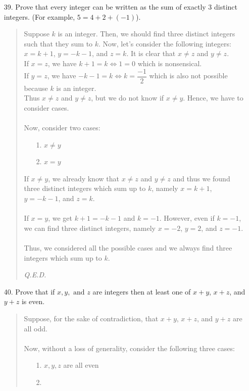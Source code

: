 \documentclass[12pt, a4paper]{article}                      %
\begin{document}
\begin{itemize}
\item[39.]
Prove that every integer can be written as the sum of exactly 3 distinct integers. (For
example, $5 = 4 + 2 + (-1)$).
\begin{quote}
Suppose $k$ is an integer. Then, we should find three distinct integers such that they sum to $k$.
Now, let's consider the following integers:\\
$x = k + 1$, $y = -k - 1$, and $z = k$. It is clear that $x \neq z$ and $y \neq z$.\\
If $x = z$, we have $k + 1 = k \iff 1 = 0$ which is nonsensical.\\
If $y = z$, we have $-k - 1 = k \iff k = \dfrac{-1}{2}$ which is also
not possible because $k$ is an integer.\\
Thus $x \neq z$ and $y \neq z$, but we do not know if $x \neq y$.
Hence, we have to consider cases.
\\\\
Now, consider two cases:
\begin{itemize}
\item[1.]
$x \neq y$
\item[2.]
$x = y$
\end{itemize}
If $x \neq y$, we already know that $x \neq z$ and $y \neq z$ and thus we found three distinct integers which sum up to $k$, namely $x = k + 1$, $y = -k - 1$, and $z = k$.
\\\\
If $x = y$, we get $k + 1 = -k - 1$ and $k = -1$. However, even if $k = -1$, we can find three distinct integers, namely $x = -2$, $y = 2$, and $z = -1$.\\\\
Thus, we considered all the possible cases and we always find three integers which sum up to $k$.
\begin{flushright}
\textit{Q.E.D.}
\end{flushright}
\end{quote}
\item[40.]
Prove that if $x, y, \mbox{ and } z$ are integers then at least one of $x + y$, $x + z$, and $y + z$ is even.
\begin{quote}
Suppose, for the sake of contradiction, that $x + y$, $x + z$, and $y + z$ are all odd.\\\\
Now, without a loss of generality, consider the following three cases:
\begin{itemize}
\item[1.]
$x,y,z$ are all even
\item[2.]

\end{itemize}
\end{quote}
\end{itemize}
\end{document}
